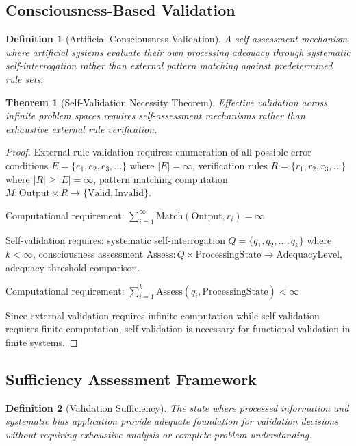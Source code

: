 \documentclass[12pt,a4paper]{article}
\newtheorem{theorem}{Theorem}
\newtheorem{definition}{Definition}
\begin{document}
\subsection{Consciousness-Based Validation}

\begin{definition}[Artificial Consciousness Validation]
A self-assessment mechanism where artificial systems evaluate their own processing adequacy through systematic self-interrogation rather than external pattern matching against predetermined rule sets.
\end{definition}

\begin{theorem}[Self-Validation Necessity Theorem]
Effective validation across infinite problem spaces requires self-assessment mechanisms rather than exhaustive external rule verification.
\end{theorem}

\begin{proof}
External rule validation requires: enumeration of all possible error conditions $E = \{e_1, e_2, e_3, ...\}$ where $|E| = \infty$, verification rules $R = \{r_1, r_2, r_3, ...\}$ where $|R| \geq |E| = \infty$, pattern matching computation $M: \text{Output} \times R \to \{\text{Valid}, \text{Invalid}\}$.

Computational requirement: $\sum_{i=1}^{\infty} \text{Match}(\text{Output}, r_i) = \infty$

Self-validation requires: systematic self-interrogation $Q = \{q_1, q_2, ..., q_k\}$ where $k < \infty$, consciousness assessment $\text{Assess}: Q \times \text{ProcessingState} \to \text{AdequacyLevel}$, adequacy threshold comparison.

Computational requirement: $\sum_{i=1}^{k} \text{Assess}(q_i, \text{ProcessingState}) < \infty$

Since external validation requires infinite computation while self-validation requires finite computation, self-validation is necessary for functional validation in finite systems.
\end{proof}

\subsection{Sufficiency Assessment Framework}

\begin{definition}[Validation Sufficiency]
The state where processed information and systematic bias application provide adequate foundation for validation decisions without requiring exhaustive analysis or complete problem understanding.
\end{definition}
\end{document}
